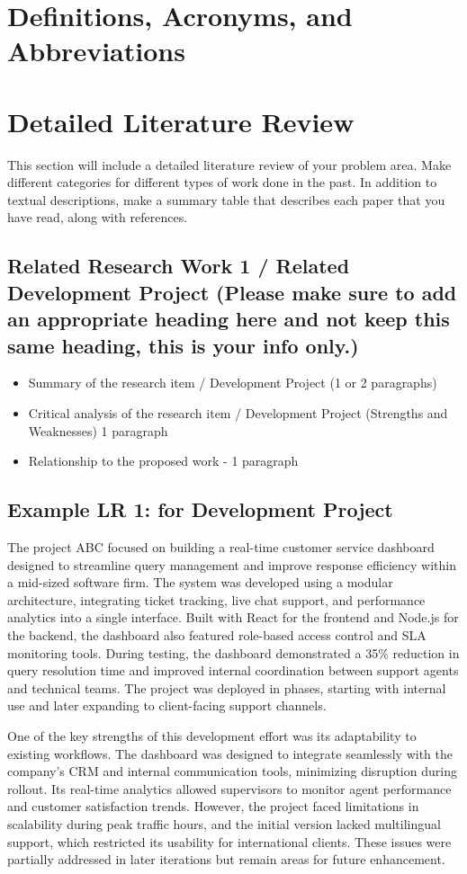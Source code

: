 \documentclass{FastFyp}
\begin{document}
\section{Definitions, Acronyms, and Abbreviations}
\section{Detailed Literature Review} 
This section will include a detailed literature review of your problem area. Make different categories for different types of work done in the past.  In addition to textual descriptions, make a summary table that describes each paper that you have read, along with references.
\subsection{Related Research Work 1 / Related Development Project (Please make sure to add an appropriate heading here and not keep this same heading, this is your info only.)}
\begin{itemize}
    \item Summary of the research item / Development Project (1 or 2 paragraphs)
  \item  Critical analysis of the research item / Development Project (Strengths and Weaknesses) 1 paragraph
  \item  Relationship to the proposed work - 1 paragraph
\end{itemize}

 \subsection{Example LR 1: for Development Project}
The project ABC \cite{ref:guyon:2007a} focused on building a real-time customer service dashboard designed to streamline query management and improve response efficiency within a mid-sized software firm. The system was developed using a modular architecture, integrating ticket tracking, live chat support, and performance analytics into a single interface. Built with React for the frontend and Node.js for the backend, the dashboard also featured role-based access control and SLA monitoring tools. During testing, the dashboard demonstrated a 35\% reduction in query resolution time and improved internal coordination between support agents and technical teams. The project was deployed in phases, starting with internal use and later expanding to client-facing support channels.

One of the key strengths of this development effort was its adaptability to existing workflows. The dashboard was designed to integrate seamlessly with the company’s CRM and internal communication tools, minimizing disruption during rollout. Its real-time analytics allowed supervisors to monitor agent performance and customer satisfaction trends. However, the project faced limitations in scalability during peak traffic hours, and the initial version lacked multilingual support, which restricted its usability for international clients. These issues were partially addressed in later iterations but remain areas for future enhancement.
\end{document}

